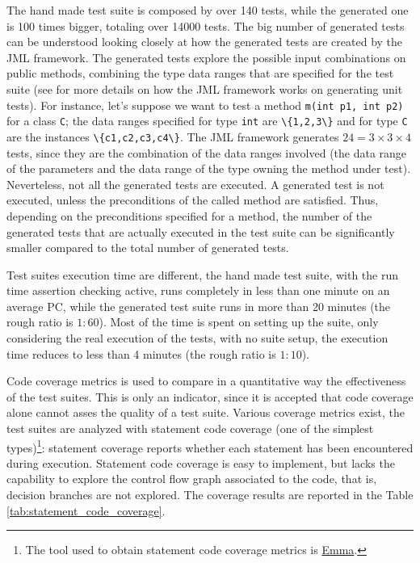 \documentclass{article}
\newcommand{\myhref}[2]{\ifpdf\href{#1}{#2}\else\htmladdnormallinkfoot{#2}{#1}\fi}
\newcommand{\lil}[1]{\texttt{\lstinline|#1|}}
\begin{document}
The hand made test suite is composed by over 140 tests, while the generated one is 100 times bigger, totaling over 14000 tests.
The big number of generated tests can be understood looking closely at how the generated tests are created by the JML framework. 
The generated tests explore the possible input combinations on public methods, combining the type data ranges that are specified for the test suite (see \cite{Cheon-Leavens02} for more details on how the JML framework works on generating unit tests). 
For instance, let's suppose we want to test a method \lil{m(int p1, int p2)} for a class \lil{C}; the data ranges specified for type \lil{int} are \lil{\{1,2,3\}} and for type \lil{C} are the instances \lil{\{c1,c2,c3,c4\}}. 
The JML framework generates $24 = 3 \times 3 \times 4$ tests, since they are the combination of the data ranges involved (the data range of the parameters and the data range of the type owning the method under test). 
Neverteless, not all the generated tests are executed.
A generated test is not executed, unless the preconditions of the called method are satisfied. 
Thus, depending on the preconditions specified for a method, the number of the generated tests that are actually executed in the test suite can be significantly smaller compared to the total number of generated tests.

Test suites execution time are different, the hand made test suite, with the run time assertion checking active, runs completely in less than one minute on an average PC, while the generated test suite runs in more than 20 minutes (the rough ratio is $ 1 : 60 $). 
Most of the time is spent on setting up the suite, only considering the real execution of the tests, with no suite setup, the execution time reduces to less than 4 minutes (the rough ratio is $ 1 : 10 $).

Code coverage metrics is used to compare in a quantitative way the effectiveness of the test suites. 
This is only an indicator, since it is accepted that code coverage alone cannot asses the quality of a test suite\cite{Marick1999,Chockler2006}.
Various coverage metrics exist, the test suites are analyzed with statement code coverage (one of the simplest types)\footnote{The tool used to obtain statement code coverage metrics is \myhref{http://emma.sourceforge.net/}{Emma}.}: statement coverage reports whether each statement has been encountered during execution. 
Statement code coverage is easy to implement, but lacks the capability to explore the control flow graph associated to the code, that is,
decision branches are not explored. 
The coverage results are reported in the Table \ref{tab:statement_code_coverage}.
\end{document}
